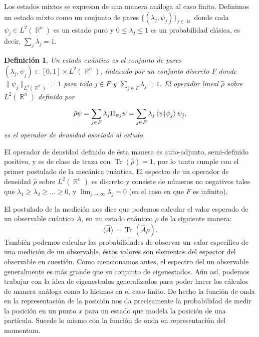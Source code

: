 \documentclass[a4paper]{report}
\DeclareMathOperator{\R}{\mathbb{R}}
\DeclareMathOperator{\N}{\mathbb{N}}
\DeclareMathOperator{\Tr}{Tr}
\newtheorem{definition}{Definición}
\begin{document}
  Los estados mixtos se expresan de una manera análoga al
  caso finito. Definimos un estado mixto como un conjunto de
  pares $\{(\lambda_j,\psi_j)\}_{j \in \N}$ donde cada
  $\psi_j \in L^2(\R^{n})$ es un estado puro y $0 \leq
  \lambda_j \leq 1$ es un probabilidad clásica, es decir,
  $\sum_j \lambda_j = 1$.
  \begin{definition}
    Un estado cuántico es el conjunto de pares $(\lambda_j,
    \psi_j) \in [0,1] \times L^2(\R^{n})$, indexado por un
    conjunto discreto $F$ donde $\|\psi_j\|_{L^2(\R^{n})} =
    1$ para todo $j \in F$ y $\sum_{j \in F} \lambda_j = 1$.
    El operador lineal $\hat{\rho}$ sobre $L^2(\R^{n})$
    definido por
    \begin{equation}
      \hat{\rho} \psi
      = \sum_{j \in F}^{} \lambda_j \Pi_{\psi_j} \psi
      = \sum_{j \in F}^{} \lambda_j \braket{\psi| \psi_j}
      \psi_j,
    \end{equation}
    es el operador de densidad asociado al estado. 
  \end{definition}
  El operador de densidad definido de ésta manera es
  auto-adjunto, semi-definido positivo, y es de clase de
  traza con $\Tr(\hat{\rho}) = 1$, por lo tanto cumple con
  el primer postulado de la mecánica cuántica. El espectro
  de un operador de densidad $\hat{\rho}$ sobre
  $L^2(\R^{n})$ es discreto y consiste de números no
  negativos tales que $\lambda_1 \geq \lambda_2 \geq \ldots
  \geq 0$, y $\lim_{j \to \infty} \lambda_j = 0$ (en el caso
  en que $F$ es infinito).

  El postulado de la medición nos dice que podemos calcular
  el valor esperado de un observable cuántico $A$, en un
  estado cuántico $\rho$ de la siguiente manera:
  \begin{equation}
    \langle \hat A \rangle = \Tr(\hat A \rho).
  \end{equation}
  También podemos calcular las probabilidades de observar un
  valor específico de una medición de un observable, éstos
  valores son elementos del espector del observable en
  cuestión.  Como mencionamos antes, el espectro del un
  observable generalmente es más grande que su conjunto de
  eigenestados. Aún así, podemos trabajar con la idea de
  eigenestados generalizados para poder hacer los cálculos
  de manera análoga como lo hicimos en el caso finito. De
  hecho la función de onda en la representación de la
  posición nos da precisamente la probabilidad de medir la
  posición en un punto $x$ para un estado que modela la
  posición de una partícula. Sucede lo mismo con la función
  de onda en representación del momentum.
  
\end{document}
